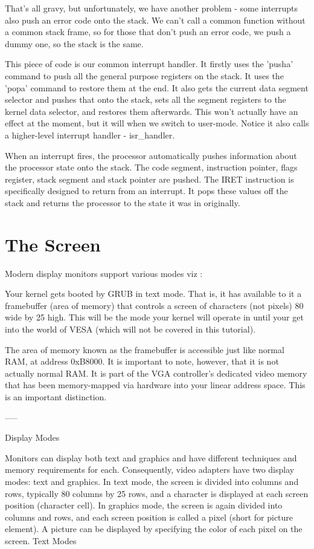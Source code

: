 \documentclass[11pt]{article}
\begin{document}
That's all gravy, but unfortunately, we have another problem - some interrupts also push an error code onto the stack. We can't call a common function without a common stack frame, so for those that don't push an error code, we push a dummy one, so the stack is the same.

This piece of code is our common interrupt handler. It firstly uses the 'pusha' command to push all the general purpose registers on the stack. It uses the 'popa' command to restore them at the end. It also gets the current data segment selector and pushes that onto the stack, sets all the segment registers to the kernel data selector, and restores them afterwards. This won't actually have an effect at the moment, but it will when we switch to user-mode. Notice it also calls a higher-level interrupt handler - isr\_handler.

When an interrupt fires, the processor automatically pushes information about the processor state onto the stack. The code segment, instruction pointer, flags register, stack segment and stack pointer are pushed. The IRET instruction is specifically designed to return from an interrupt. It pops these values off the stack and returns the processor to the state it was in originally.


\section{The Screen}

Modern display monitors support various modes viz :

Your kernel gets booted by GRUB in text mode. That is, it has available to it a framebuffer (area of memory) that controls a screen of characters (not pixels) 80 wide by 25 high. This will be the mode your kernel will operate in until your get into the world of VESA (which will not be covered in this tutorial).

The area of memory known as the framebuffer is accessible just like normal RAM, at address 0xB8000. It is important to note, however, that it is not actually normal RAM. It is part of the VGA controller's dedicated video memory that has been memory-mapped via hardware into your linear address space. This is an important distinction.

----- 

Display Modes

Monitors can display both text and graphics and have different techniques and memory requirements for each. Consequently, video adapters have two display modes: text and graphics.
In text mode, the screen is divided into columns and rows, typically 80 columns by 25 rows, and a character is displayed at each screen position (character cell).
In graphics mode, the screen is again divided into columns and rows, and each screen position is called a pixel (short for picture element). A picture can be displayed by specifying the color of each pixel on the screen.
Text Modes
\end{document}
